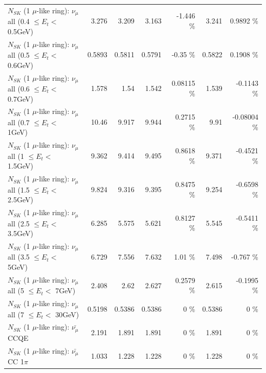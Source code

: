 \begin{table}
\begin{tabular}{| l | r | r | r  r | r  r |}
       $N_{SK}$ (1 $\mu$-like ring): $\nu_{\mu}$ all (0.4 $\leq E_{t} <$ 0.5GeV) &           3.276 &           3.209 &           3.163 &   -1.446 \%  &           3.241 &   0.9892 \%  \\ 
       $N_{SK}$ (1 $\mu$-like ring): $\nu_{\mu}$ all (0.5 $\leq E_{t} <$ 0.6GeV) &          0.5893 &          0.5811 &          0.5791 &    -0.35 \%  &          0.5822 &   0.1908 \%  \\ 
       $N_{SK}$ (1 $\mu$-like ring): $\nu_{\mu}$ all (0.6 $\leq E_{t} <$ 0.7GeV) &           1.578 &            1.54 &           1.542 &  0.08115 \%  &           1.539 &  -0.1143 \%  \\ 
         $N_{SK}$ (1 $\mu$-like ring): $\nu_{\mu}$ all (0.7 $\leq E_{t} <$ 1GeV) &           10.46 &           9.917 &           9.944 &   0.2715 \%  &            9.91 & -0.08004 \%  \\ 
         $N_{SK}$ (1 $\mu$-like ring): $\nu_{\mu}$ all (1 $\leq E_{t} <$ 1.5GeV) &           9.362 &           9.414 &           9.495 &   0.8618 \%  &           9.371 &  -0.4521 \%  \\ 
       $N_{SK}$ (1 $\mu$-like ring): $\nu_{\mu}$ all (1.5 $\leq E_{t} <$ 2.5GeV) &           9.824 &           9.316 &           9.395 &   0.8475 \%  &           9.254 &  -0.6598 \%  \\ 
       $N_{SK}$ (1 $\mu$-like ring): $\nu_{\mu}$ all (2.5 $\leq E_{t} <$ 3.5GeV) &           6.285 &           5.575 &           5.621 &   0.8127 \%  &           5.545 &  -0.5411 \%  \\ 
         $N_{SK}$ (1 $\mu$-like ring): $\nu_{\mu}$ all (3.5 $\leq E_{t} <$ 5GeV) &           6.729 &           7.556 &           7.632 &     1.01 \%  &           7.498 &   -0.767 \%  \\ 
           $N_{SK}$ (1 $\mu$-like ring): $\nu_{\mu}$ all (5 $\leq E_{t} <$ 7GeV) &           2.408 &            2.62 &           2.627 &   0.2579 \%  &           2.615 &  -0.1995 \%  \\ 
          $N_{SK}$ (1 $\mu$-like ring): $\nu_{\mu}$ all (7 $\leq E_{t} <$ 30GeV) &          0.5198 &          0.5386 &          0.5386 &        0 \%  &          0.5386 &        0 \%  \\ 
\hline
\hline
\hline
                              $N_{SK}$ (1 $\mu$-like ring): $\bar{\nu_\mu}$ CCQE &           2.191 &           1.891 &           1.891 &        0 \%  &           1.891 &        0 \%  \\ 
                         $N_{SK}$ (1 $\mu$-like ring): $\bar{\nu_\mu}$ CC 1$\pi$ &           1.033 &           1.228 &           1.228 &        0 \%  &           1.228 &        0 \%  \\ 

\end{tabular}
\end{table}

